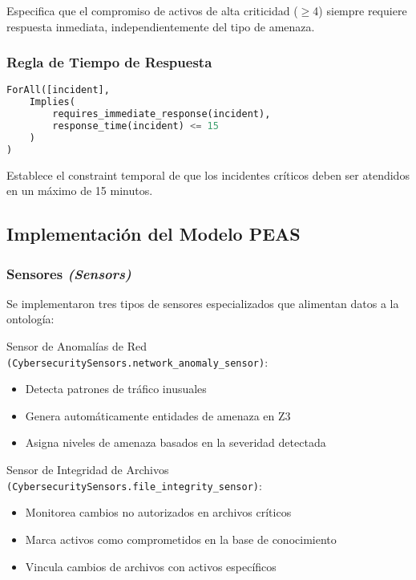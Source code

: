 Especifica que el compromiso de activos de alta criticidad ($\geq$4) siempre requiere respuesta inmediata, independientemente del tipo de amenaza.

\subsubsection{Regla de Tiempo de Respuesta}

\begin{lstlisting}[language=python, caption={Regla de Tiempo de Respuesta en Z3}, label={lst:response_time}]
ForAll([incident],
    Implies(
        requires_immediate_response(incident),
        response_time(incident) <= 15
    )
)
\end{lstlisting}

Establece el constraint temporal de que los incidentes críticos deben ser atendidos en un máximo de 15 minutos.

\subsection{Implementación del Modelo PEAS}

\subsubsection{Sensores \textit{(Sensors)}}

Se implementaron tres tipos de sensores especializados que alimentan datos a la ontología:

\noindent Sensor de Anomalías de Red \verb|(CybersecuritySensors.network_anomaly_sensor)|:

\begin{itemize}
    \item Detecta patrones de tráfico inusuales
    \item Genera automáticamente entidades de amenaza en Z3
    \item Asigna niveles de amenaza basados en la severidad detectada
\end{itemize}

\noindent Sensor de Integridad de Archivos \verb|(CybersecuritySensors.file_integrity_sensor)|:

\begin{itemize}
    \item Monitorea cambios no autorizados en archivos críticos
    \item Marca activos como comprometidos en la base de conocimiento
    \item Vincula cambios de archivos con activos específicos
\end{itemize}

